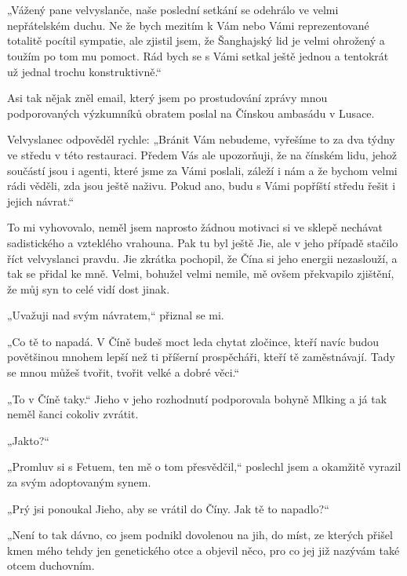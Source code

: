 \chapter{}
„Vážený pane velvyslanče,
naše poslední setkání se odehrálo ve velmi nepřátelském duchu. Ne že bych mezitím k Vám nebo Vámi reprezentované totalitě pocítil sympatie, ale zjistil jsem, že Šanghajský lid je velmi ohrožený a toužím po tom mu pomoct. Rád bych se s Vámi setkal ještě jednou a tentokrát už jednal trochu konstruktivně.“

Asi tak nějak zněl email, který jsem po prostudování zprávy mnou podporovaných výzkumníků obratem poslal na Čínskou ambasádu v Lusace.

Velvyslanec odpověděl rychle: „Bránit Vám nebudeme, vyřešíme to za dva týdny ve středu v této  restauraci. Předem Vás ale upozorňuji, že na čínském lidu, jehož součástí jsou i agenti, které jsme za Vámi poslali, záleží i nám a že bychom velmi rádi věděli, zda jsou ještě naživu. Pokud ano, budu s Vámi popříští středu řešit i jejich návrat.“

To mi vyhovovalo, neměl jsem naprosto žádnou motivaci si ve sklepě nechávat sadistického a vzteklého vrahouna. Pak tu byl ještě Jie, ale v jeho případě stačilo říct velvyslanci pravdu. Jie zkrátka pochopil, že Čína si jeho energii nezaslouží, a tak se přidal ke mně. Velmi, bohužel velmi nemile, mě ovšem překvapilo zjištění, že můj syn to celé vidí dost jinak.

„Uvažuji nad svým návratem,“ přiznal se mi.

„Co tě to napadá. V Číně budeš moct leda chytat zločince, kteří navíc budou povětšinou mnohem lepší než ti příšerní prospěcháři, kteří tě zaměstnávají. Tady se mnou můžeš tvořit, tvořit velké a dobré věci.“

„To v Číně taky.“ Jieho v jeho rozhodnutí podporovala bohyně Mlking a já tak neměl šanci cokoliv zvrátit.

„Jakto?“

„Promluv si s Fetuem, ten mě o tom přesvědčil,“ poslechl jsem a okamžitě vyrazil za svým adoptovaným synem.

„Prý jsi ponoukal Jieho, aby se vrátil do Číny. Jak tě to napadlo?“

„Není to tak dávno, co jsem podnikl dovolenou na jih, do míst, ze kterých přišel kmen mého tehdy jen genetického otce a objevil něco, pro co jej již nazývám také otcem duchovním. 


